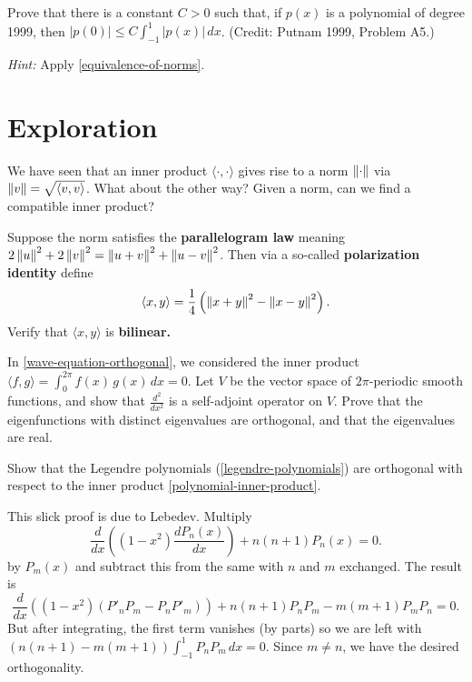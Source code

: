 \documentclass{homework}
\begin{document}
\begin{problem}
  Prove that there is a constant $C > 0$  such that,  if  $p(x)$  is a polynomial of degree 1999,  then  $|p(0)| \leq C \displaystyle\int_{-1}^1 \left|p(x)\right| \, dx$. (Credit: Putnam 1999, Problem A5.)
  
  \textit{Hint:} Apply \ref{equivalence-of-norms}.
\end{problem}

\section{Exploration}

\begin{problem}
  We have seen that an inner product $\langle \cdot,\cdot\rangle$
  gives rise to a norm $\left\lVert\cdot\right\rVert$ via
  $\left\lVert v\right\rVert = \sqrt{\langle v, v \rangle}$.  What about the other way?
  Given a norm, can we find a compatible inner product?

  Suppose the norm satisfies the \textbf{parallelogram law} meaning
  $2 \left\lVert u\right\rVert^2 + 2 \left\lVert v\right\rVert^2 = \left\lVert u+v\right\rVert^2 + \left\lVert u-v\right\rVert^2$.
  Then via a so-called \textbf{polarization identity} define \[
    \langle x, y\rangle = \frac{1}{4} \left( \left\lVert x+y\right\rVert^2 - \left\lVert x-y\right\rVert^2 \right).
  \]
  Verify that $\langle x, y\rangle$ is \textbf{bilinear.}
\end{problem}

\begin{problem}
  In \ref{wave-equation-orthogonal}, we considered the inner product
  \( \langle f,g \rangle =
    \displaystyle\int_0^{2\pi} f(x) \, g(x) \, dx = 0. \)
  Let $V$ be the vector space of $2\pi$-periodic smooth functions, and show that $\frac{d^2}{dx^2}$ is a self-adjoint operator on $V$.  Prove that the eigenfunctions with distinct eigenvalues are orthogonal, and that the eigenvalues are real.
\end{problem}

\begin{problem}\label{legendre-orthogonal}Show that the Legendre polynomials (\ref{legendre-polynomials}) are orthogonal with respect to the inner product \eqref{polynomial-inner-product}.
\end{problem}

\begin{solution}
  This slick proof is due to Lebedev.  Multiply
    \[
      \frac{d}{dx}\left(\left(1-x^{2}\right){\frac {d P_{n}(x)}{dx}}\right)+n(n+1)P_{n}(x)=0.
    \]
    by $P_{m}(x)$ and subtract this from the same with $n$ and $m$ exchanged.  The result is
    \[
      \frac{d}{dx}\left(\left(1-x^{2}\right) \left( P'_n P_m - P_n P'_m \right) \right)+n(n+1)P_{n} P_{m} - m(m+1)P_{m} P_{n} =0.
    \]
    But after integrating, the first term vanishes (by parts) so we are left with $\left( n(n+1) - m(m+1) \right) \int_{-1}^1 P_n P_m \, dx = 0$.  Since $m \neq n$, we have the desired orthogonality.
\end{solution}
\end{document}
